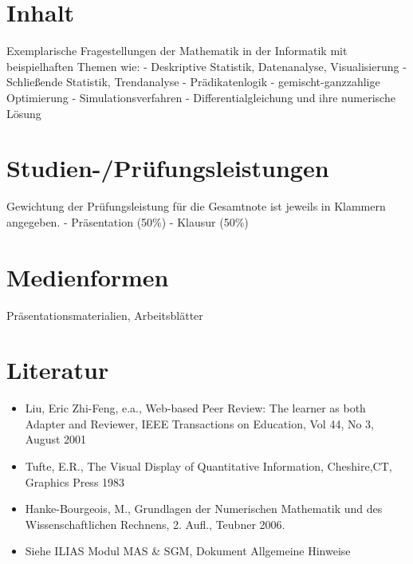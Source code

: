 \section*{Inhalt\label{/mi-2017/modulbeschreibungen-master/MA_All_Modul_Mathematik}}\label{inhaltpathlabelmi-2017modulbeschreibungen-mastermaux5fallux5fmodulux5fmathematik}

Exemplarische Fragestellungen der Mathematik in der Informatik mit
beispielhaften Themen wie: - Deskriptive Statistik, Datenanalyse,
Visualisierung - Schließende Statistik, Trendanalyse - Prädikatenlogik -
gemischt-ganzzahlige Optimierung - Simulationsverfahren -
Differentialgleichung und ihre numerische Lösung

\section*{Studien-/Prüfungsleistungen\label{/mi-2017/modulbeschreibungen-master/MA_All_Modul_Mathematik}}\label{studien-pruxfcfungsleistungenpathlabelmi-2017modulbeschreibungen-mastermaux5fallux5fmodulux5fmathematik}

Gewichtung der Prüfungsleistung für die Gesamtnote ist jeweils in
Klammern angegeben. - Präsentation (50\%) - Klausur (50\%)

\section*{Medienformen\label{/mi-2017/modulbeschreibungen-master/MA_All_Modul_Mathematik}}\label{medienformenpathlabelmi-2017modulbeschreibungen-mastermaux5fallux5fmodulux5fmathematik}

Präsentationsmaterialien, Arbeitsblätter

\section*{Literatur\label{/mi-2017/modulbeschreibungen-master/MA_All_Modul_Mathematik}}\label{literaturpathlabelmi-2017modulbeschreibungen-mastermaux5fallux5fmodulux5fmathematik}

\begin{itemize}
\tightlist
\item
  Liu, Eric Zhi-Feng, e.a., Web-based Peer Review: The learner as both
  Adapter and Reviewer, IEEE Transactions on Education, Vol 44, No 3,
  August 2001
\item
  Tufte, E.R., The Visual Display of Quantitative Information,
  Cheshire,CT, Graphics Press 1983
\item
  Hanke-Bourgeois, M., Grundlagen der Numerischen Mathematik und des
  Wissenschaftlichen Rechnens, 2. Aufl., Teubner 2006.
\item
  Siehe ILIAS Modul MAS \& SGM, Dokument Allgemeine Hinweise
\end{itemize}

